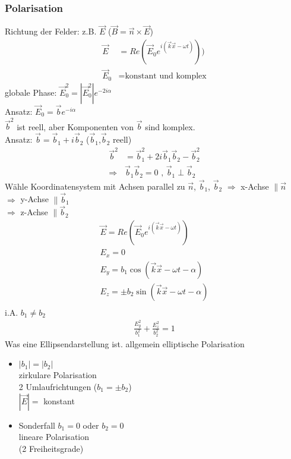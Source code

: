 \documentclass[a4paper]{article}
\begin{document}
\subsubsection{Polarisation}
Richtung der Felder: z.B. $\vec{E}$ ($\vec{B}=\vec{n}\times\vec{E}$)
\begin{align}
\vec{E}&=Re(\vec{E}_0 e^{i(\vec{k}\vec{x}-\omega t)}))\\
\vec{E}_0&=\text{konstant und komplex}
\end{align}
globale Phase: $\vec{E}_0^2=|\vec{E}_0^2|e^{-2i\alpha}$\\
Ansatz: $\vec{E}_0=\vec{b}e^{-i\alpha}$\\
$\vec{b}^2$ ist reell, aber Komponenten von $\vec{b}$ sind komplex.\\
Ansatz: $\vec{b}=\vec{b}_1+i\vec{b}_2$ ($\vec{b}_1$,$\vec{b}_2$ reell)\\
\begin{align}
\vec{b}^2&=\vec{b}_1^2+2i\vec{b}_1\vec{b}_2-\vec{b}_2^2\\
\Rightarrow &\vec{b}_1\vec{b}_2=0 \text{ , }\vec{b}_1\perp\vec{b}_2
\end{align}
Wähle Koordinatensystem mit Achsen parallel zu $\vec{n}$, $\vec{b}_1$,
$\vec{b}_2$
$\Rightarrow$ x-Achse $\parallel \vec{n}$\\
$\Rightarrow$ y-Achse $\parallel \vec{b}_1$\\
$\Rightarrow$ z-Achse $\parallel \vec{b}_2$\\
\begin{align}
\vec{E}=Re(\vec{E}_0 e^{i(\vec{k}\vec{x}-\omega t)})\\
E_x=0\\
E_y=b_1 \cos(\vec{k}\vec{x}-\omega t -\alpha)\\
E_z=\pm b_2 \sin(\vec{k}\vec{x}-\omega t -\alpha)\\
\end{align}
i.A. $b_1\neq b_2$
\begin{align}
\frac{E_y^2}{b_1^2}+\frac{E_z^2}{b_2^2}=1
\end{align}
Was eine Ellipsendarstellung ist.
allgemein elliptische Polarisation
\begin{itemize}
  \item $|b_1|=|b_2|$\\ zirkulare Polarisation \\ 2 Umlaufrichtungen ($b_1=\pm
  b_2$) \\ $|\vec{E}|=$ konstant
  \item Sonderfall $b_1=0$ oder $b_2=0$ \\ lineare Polarisation \\ (2
  Freiheitsgrade)
\end{itemize}
\end{document}

